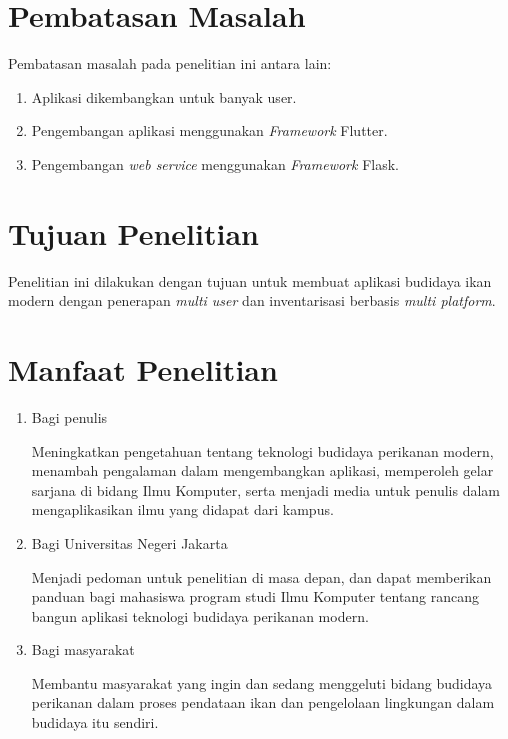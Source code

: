 \section{Pembatasan Masalah}
Pembatasan masalah pada penelitian ini antara lain:
\begin{enumerate}
	\item Aplikasi dikembangkan untuk banyak user.
	\item Pengembangan aplikasi menggunakan \emph{Framework} Flutter.
	\item Pengembangan \emph{web service} menggunakan \emph{Framework} Flask.
\end{enumerate}

\section{Tujuan Penelitian}
	Penelitian ini dilakukan dengan tujuan untuk membuat aplikasi budidaya ikan modern dengan penerapan \emph{multi user} dan inventarisasi berbasis \emph{multi platform}.

\section{Manfaat Penelitian}
\begin{enumerate}
	\item Bagi penulis
		
	Meningkatkan pengetahuan tentang teknologi budidaya perikanan modern, menambah pengalaman dalam mengembangkan aplikasi, memperoleh gelar sarjana di bidang Ilmu Komputer, serta menjadi media untuk penulis dalam mengaplikasikan ilmu yang didapat dari kampus.
		
	\item Bagi Universitas Negeri Jakarta
	 	
	Menjadi pedoman untuk penelitian di masa depan, dan dapat memberikan panduan bagi mahasiswa program studi Ilmu Komputer tentang rancang bangun aplikasi teknologi budidaya perikanan modern.
	
	\item Bagi masyarakat
	 	
	Membantu masyarakat yang ingin dan sedang menggeluti bidang budidaya perikanan dalam proses pendataan ikan dan pengelolaan lingkungan dalam budidaya itu sendiri.
	 			
\end{enumerate}

